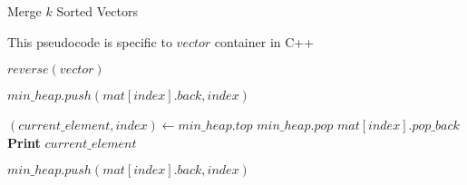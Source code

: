 \documentclass[12pt]{article}
\begin{document}
\begin{algorithm}

  \caption{Merge $k$ Sorted Vectors}
  
  \begin{algorithmic}[1]
    \Require This pseudocode is specific to $vector$ container in C++
    \Statex

    
    \Statex
    
            \State $reverse(vector)$
        \EndFor
        
         
            \State $min\_heap.push(mat[index].back, index)$
        \EndFor
        
            \State $(current\_element, index) \gets min\_heap.top$
            \State $min\_heap.pop$
            \State $mat[index].pop\_back$
            \State \textbf{Print} $current\_element$
            
                \State $min\_heap.push(mat[index].back, index)$
            \EndIf
        \EndWhile
    \EndFunction
  \end{algorithmic}
  
\end{algorithm}
\end{document}
